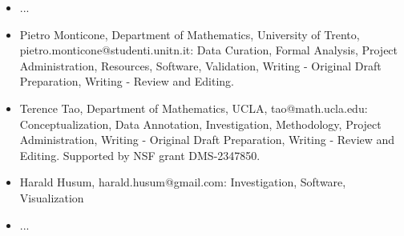 \begin{itemize}
    \item ...
    \item Pietro Monticone, Department of Mathematics, University of Trento, pietro.monticone@studenti.unitn.it: Data Curation, Formal Analysis, Project Administration, Resources, Software, Validation, Writing - Original Draft Preparation, Writing - Review and Editing.
    \item Terence Tao, Department of Mathematics, UCLA, tao@math.ucla.edu: Conceptualization, Data Annotation, Investigation, Methodology, Project Administration, Writing - Original Draft Preparation, Writing - Review and Editing. Supported by NSF grant DMS-2347850.
    \item Harald Husum, harald.husum@gmail.com: Investigation, Software, Visualization
    \item ...
\end{itemize}
